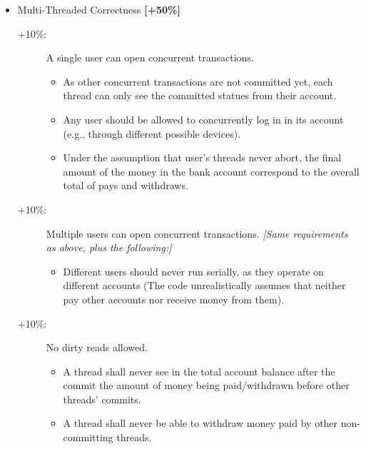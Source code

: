 \documentclass{article}
\begin{document}
\begin{itemize}
\begin{description}
%




		\end{description}


	\item  Multi-Threaded Correctness \textbf{[+50\%]}
\begin{description}
	\item [+10\%:] A single user can open concurrent transactions.
	\begin{itemize}
		\item As other concurrent transactions are not committed yet, each thread can only see the committed statues from their account.
		\item Any user should be allowed to concurrently log in in its account (e.g., through different possible devices).
		\item Under the assumption that user's threads never abort, the final amount of the money in the bank account correspond to the overall total of pays and withdraws.
	\end{itemize}
	\item [+10\%:] Multiple users can open concurrent transactions. \textit{[Same requirements as above, plus the following:]}
\begin{itemize}
	\item Different users should never run serially, as they operate on different accounts (The code unrealistically assumes that neither  pay other accounts nor receive money from them).
\end{itemize}
\item [+10\%:] No dirty reads allowed.
\begin{itemize}
	\item A thread shall never see in the total account balance after the commit the amount of money being paid/withdrawn before other threads' commits.
	\item A thread shall never be able to withdraw money paid by other non-committing threads. 

\end{itemize}
\end{description}
\end{itemize}
\end{document}
